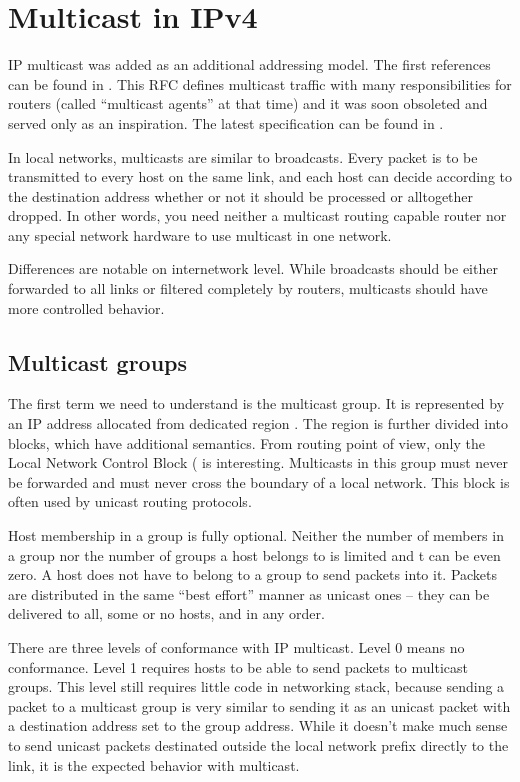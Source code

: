 \chapter{Multicast in IPv4}

IP multicast was added as an additional addressing model. The first
references can be found in . This RFC defines multicast traffic
with many responsibilities for routers (called ``multicast agents'' at that time)
and it was soon obsoleted and served only as an inspiration. The latest
specification can be found in .

In local networks, multicasts are similar to broadcasts. Every packet is to be
transmitted to every host on the same link, and each host can decide according to
the destination address whether or not it should be processed or alltogether
dropped. In other words, you need neither a multicast routing capable router
nor any special network hardware to use multicast in one network.

Differences are notable on internetwork level. While broadcasts should be
either forwarded to all links or filtered completely by routers, multicasts
should have more controlled behavior.

\section{Multicast groups}

The first term we need to understand is the multicast group. It is represented by an IP
address allocated from dedicated region . The region is further
divided into blocks, which have additional semantics. From routing point of
view, only the Local Network Control Block ( is
interesting. Multicasts in this group must never be forwarded and must never
cross the boundary of a local network. This block is often used by unicast
routing protocols.

Host membership in a group is fully optional. Neither the number of members in
a group nor the number of groups a host belongs to is limited and t can be even
zero. A host does not have to belong to a group to send packets into it.
Packets are distributed in the same ``best effort'' manner as unicast ones -- they can
be delivered to all, some or no hosts, and in any order.

There are three levels of conformance with IP multicast. Level 0 means no
conformance. Level 1 requires hosts to be able to send packets to multicast
groups. This level still requires little code in networking stack, because
sending a packet to a multicast group is very similar to sending it as an unicast
packet with a destination address set to the group address. While it doesn't make much
sense to send unicast packets destinated outside the local network prefix directly
to the link, it is the expected behavior with multicast.


